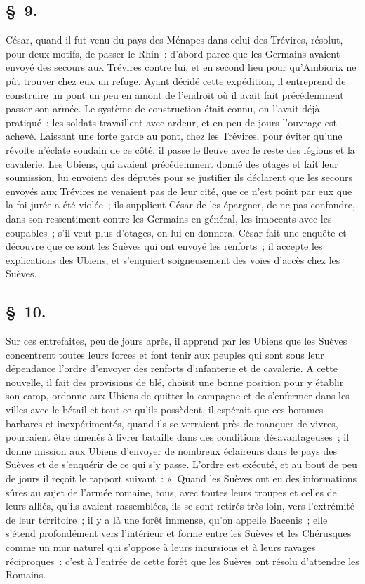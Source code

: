 \documentclass[french,twoside]{book} %
\begin{document}
\subsection[{§ 9.}]{ \textsc{§ 9.} }
\noindent César, quand il fut venu du pays des Ménapes dans celui des Trévires, résolut, pour deux motifs, de passer le Rhin : d’abord parce que les Germains avaient envoyé des secours aux Trévires contre lui, et en second lieu pour qu’Ambiorix ne pût trouver chez eux un refuge. Ayant décidé cette expédition, il entreprend de construire un pont un peu en amont de l’endroit où il avait fait précédemment passer son armée. Le système de construction était connu, on l’avait déjà pratiqué ; les soldats travaillent avec ardeur, et en peu de jours l’ouvrage est achevé. Laissant une forte garde au pont, chez les Trévires, pour éviter qu’une révolte n’éclate soudain de ce côté, il passe le fleuve avec le reste des légions et la cavalerie. Les Ubiens, qui avaient précédemment donné des otages et fait leur soumission, lui envoient des députés pour se justifier ils déclarent que les secours envoyés aux Trévires ne venaient pas de leur cité, que ce n’est point par eux que la foi jurée a été violée ; ils supplient César de les épargner, de ne pas confondre, dans son ressentiment contre les Germains en général, les innocents avec les coupables ; s’il veut plus d’otages, on lui en donnera. César fait une enquête et découvre que ce sont les Suèves qui ont envoyé les renforts ; il accepte les explications des Ubiens, et s’enquiert soigneusement des voies d’accès chez les Suèves.
\subsection[{§ 10.}]{ \textsc{§ 10.} }
\noindent Sur ces entrefaites, peu de jours après, il apprend par les Ubiens que les Suèves concentrent toutes leurs forces et font tenir aux peuples qui sont sous leur dépendance l’ordre d’envoyer des renforts d’infanterie et de cavalerie. A cette nouvelle, il fait des provisions de blé, choisit une bonne position pour y établir son camp, ordonne aux Ubiens de quitter la campagne et de s’enfermer dans les villes avec le bétail et tout ce qu’ils possèdent, il espérait que ces hommes barbares et inexpérimentés, quand ils se verraient près de manquer de vivres, pourraient être amenés à livrer bataille dans des conditions désavantageuses ; il donne mission aux Ubiens d’envoyer de nombreux éclaireurs dans le pays des Suèves et de s’enquérir de ce qui s’y passe. L'ordre est exécuté, et au bout de peu de jours il reçoit le rapport suivant : « Quand les Suèves ont eu des informations sûres au sujet de l’armée romaine, tous, avec toutes leurs troupes et celles de leurs alliés, qu’ils avaient rassemblées, ils se sont retirés très loin, vers l’extrémité de leur territoire ; il y a là une forêt immense, qu’on appelle Bacenis ; elle s’étend profondément vers l’intérieur et forme entre les Suèves et les Chérusques comme un mur naturel qui s’oppose à leurs incursions et à leurs ravages réciproques : c’est à l’entrée de cette forêt que les Suèves ont résolu d’attendre les Romains.
\end{document}
